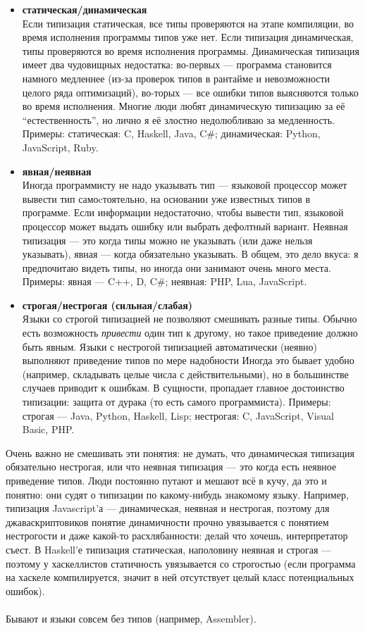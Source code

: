 \documentclass[11pt]{book}
\begin{document}
\begin{itemize}
\item \textbf{статическая/динамическая}
    \\
    Если типизация статическая, все типы проверяются на этапе компиляции, во время исполнения программы типов уже нет.
    Если типизация динамическая, типы проверяются во время исполнения программы.
    Динамическая типизация имеет два чудовищных недостатка: во-первых --- программа становится намного медленнее
    (из-за проверок типов в рантайме и невозможности целого ряда оптимизаций),
    во-торых --- все ошибки типов выясняются только во время исполнения.
    Многие люди любят динамическую типизацию за её ``естественность'', но лично я её злостно недолюбливаю за медленность.
    Примеры: статическая: C, Haskell, Java, C\#; динамическая: Python, JavaScript, Ruby.

\item \textbf{явная/неявная}
    \\
    Иногда программисту не надо указывать тип --- языковой процессор может вывести тип самоcтоятельно, на основании уже известных типов в программе.
    Если информации недостаточно, чтобы вывести тип, языковой процессор может выдать ошибку или выбрать дефолтный вариант.
    Неявная типизация --- это когда типы можно не указывать (или даже нельзя указывать), явная --- когда обязательно указывать.
    В общем, это дело вкуса: я предпочитаю видеть типы, но иногда они занимают очень много места.
    Примеры: явная --- C++, D, C\#; неявная: PHP, Lua, JavaScript.

\item \textbf{строгая/нестрогая (сильная/слабая)}
    \\
    Языки со строгой типизацией не позволяют смешивать разные типы.
    Обычно есть возможность \emph{привести} один тип к другому, но такое приведение должно быть явным.
    Языки с нестрогой типизацией автоматически (неявно) выполняют приведение типов по мере надобности
    Иногда это бывает удобно (например, складывать целые числа с действительными), но в большинстве случаев приводит к ошибкам.
    В сущности, пропадает главное достоинство типизации: защита от дурака (то есть самого программиста).
    Примеры: строгая --- Java, Python, Haskell, Lisp; нестрогая: C, JavaScript, Visual Basic, PHP.
\end{itemize}
Очень важно не смешивать эти понятия: не думать, что динамическая типизация обязательно нестрогая,
или что неявная типизация --- это когда есть неявное приведение типов.
Люди постоянно путают и мешают всё в кучу, да это и понятно: они судят о типизации по какому-нибудь знакомому языку.
Например, типизация Javascript'а --- динамическая, неявная и нестрогая,
поэтому для джаваскриптовиков понятие динамичности прочно увязывается с понятием нестрогости и даже какой-то расхлябанности:
делай что хочешь, интерпретатор съест.
В Haskell'е типизация статическая, наполовину неявная и строгая --- поэтому у хаскеллистов статичность увязывается со строгостью
(если программа на хаскеле компилируется, значит в ней отсутствует целый класс потенциальных ошибок).
\\ \\
Бывают и языки совсем без типов (например, Assembler).
\end{document}

